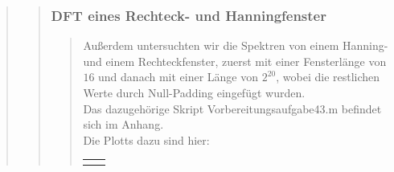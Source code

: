 \begin{quote}
\begin{quote}
\begin{quote}
		\end{quote}

        \subsubsection{DFT eines Rechteck- und Hanningfenster}
		\begin{quote}
            Außerdem untersuchten wir die Spektren von einem Hanning- und einem Rechteckfenster, zuerst mit einer
            Fensterlänge von $16$ und danach mit einer Länge von $2^{20}$, wobei die restlichen Werte durch Null-Padding
            eingefügt wurden.\\
            Das dazugehörige Skript Vorbereitungsaufgabe43.m befindet sich im Anhang.\\
            Die Plotts dazu sind hier:
            
                \begin{center}
                \begin{tabular}{ll}
    
                \hspace{-11em}
                    \begin{minipage}{0.6\textwidth}
    

\end{minipage}
\end{tabular}
\end{center}
\end{quote}
\end{quote}
\end{quote}
